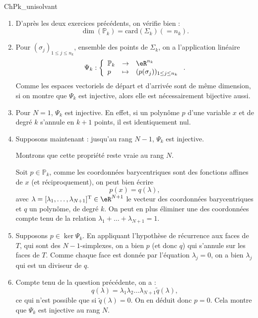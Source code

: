 \begin{corrige}{ChPk_unisolvant}

\begin{enumerate}

\item D'après les deux exercices précédents, on vérifie bien :  $$\dim(\mathbb{P}_k) = \mbox{card}(\Sigma_k) (=n_k).$$

\item Pour $(\sigma_j)_{1\leq j\leq n_k}$, ensemble des points de $\Sigma_k$, on a l'application linéaire \[
\Psi_k : \left \{
\begin{array}{lcl}
\mathbb{P}_k &\rightarrow &\eR^{n_k}\\
p & \mapsto & (p(\sigma_j))_{1\leq j\leq n_k}
\end{array}
\right. .
\]
Comme les espaces vectoriels de départ et d'arrivée sont de même dimension, si on montre que $\Psi_k$ est injective, alors elle est nécessairement bijective aussi.

\item Pour $N=1$, $\Psi_k$ est injective. En effet, si un polynôme $p$ d'une variable $x$ et de degré $k$ s'annule en $k+1$ points, il est identiquement nul.

\item Supposons maintenant : jusqu'au rang $N-1$, $\Psi_k$ est injective. 

Montrons que cette propriété reste vraie au rang $N$.

Soit $p\in\mathbb{P}_k$, comme les coordonnées barycentriques sont des fonctions affines de $x$ (et réciproquement), on peut bien écrire 
\[
p(x) = q(\lambda),
\]
avec $\lambda = [\lambda_1,\ldots,\lambda_{N+1}]^\mathrm{T}\in \eR^{N+1}$ le vecteur des coordonnées barycentriques et $q$ un polynôme, de degré $k$. On peut en plus éliminer une des coordonnées compte tenu de la relation $\lambda_1 + \ldots + \lambda_{N+1} = 1$.

\item Supposons $p \in \ker{\Psi_k}$. En appliquant l'hypothèse de récurrence aux faces de $T$, qui sont des $N-1$-simplexes, on a bien $p$ (et donc $q$) qui s'annule sur les faces de $T$.
Comme chaque face est donnée par l'équation $\lambda_j = 0$, on a bien $\lambda_j$ qui est un diviseur de $q$.

\item Compte tenu de la question précédente, on a :
\[
q(\lambda) = \lambda_1 \lambda_2 \ldots \lambda_{N+1} \tilde q(\lambda),
\]
ce qui n'est possible que si $\tilde q(\lambda) = 0$. On en déduit donc $p=0$. Cela montre que $\Psi_k$ est injective au rang $N$.


\end{enumerate}
\end{corrige}
